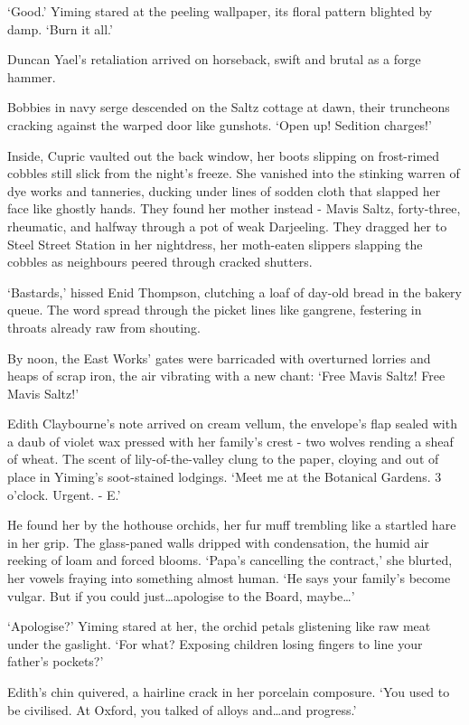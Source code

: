 `Good.' Yiming stared at the peeling wallpaper, its floral pattern blighted by damp. `Burn it all.'

Duncan Yael's retaliation arrived on horseback, swift and brutal as a forge hammer.

Bobbies in navy serge descended on the Saltz cottage at dawn, their truncheons cracking against the warped door like gunshots. `Open up! Sedition charges!'

Inside, Cupric vaulted out the back window, her boots slipping on frost-rimed cobbles still slick from the night's freeze. She vanished into the stinking warren of dye works and tanneries, ducking under lines of sodden cloth that slapped her face like ghostly hands. They found her mother instead - Mavis Saltz, forty-three, rheumatic, and halfway through a pot of weak Darjeeling. They dragged her to Steel Street Station in her nightdress, her moth-eaten slippers slapping the cobbles as neighbours peered through cracked shutters.

`Bastards,' hissed Enid Thompson, clutching a loaf of day-old bread in the bakery queue. The word spread through the picket lines like gangrene, festering in throats already raw from shouting.

By noon, the East Works' gates were barricaded with overturned lorries and heaps of scrap iron, the air vibrating with a new chant: `Free Mavis Saltz! Free Mavis Saltz!'

Edith Claybourne's note arrived on cream vellum, the envelope's flap sealed with a daub of violet wax pressed with her family's crest - two wolves rending a sheaf of wheat. The scent of lily-of-the-valley clung to the paper, cloying and out of place in Yiming's soot-stained lodgings. `Meet me at the Botanical Gardens. 3 o'clock. Urgent. - E.'

He found her by the hothouse orchids, her fur muff trembling like a startled hare in her grip. The glass-paned walls dripped with condensation, the humid air reeking of loam and forced blooms. `Papa's cancelling the contract,' she blurted, her vowels fraying into something almost human. `He says your family's become vulgar. But if you could just\dots apologise to the Board, maybe\dots'

`Apologise?' Yiming stared at her, the orchid petals glistening like raw meat under the gaslight. `For what? Exposing children losing fingers to line your father's pockets?'

Edith's chin quivered, a hairline crack in her porcelain composure. `You used to be civilised. At Oxford, you talked of alloys and\dots and progress.'

